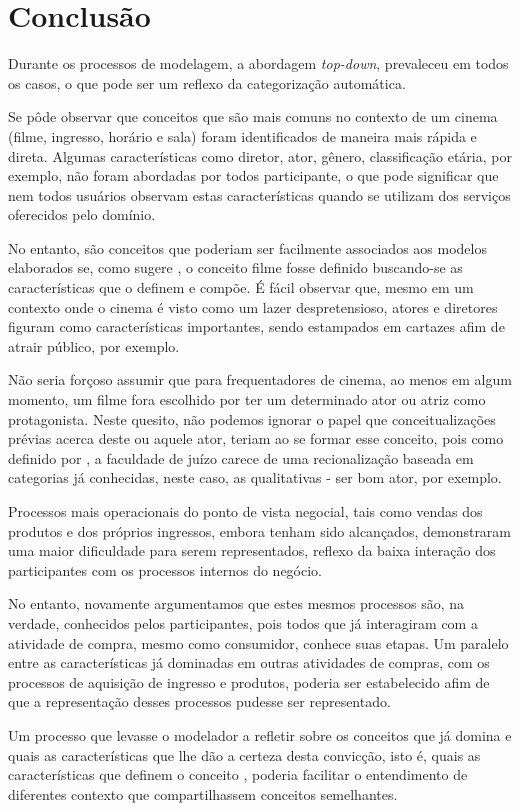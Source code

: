 \section{\hspace*{3pt} Conclusão}
\label{sec:conclusaoModeloConceitual}

Durante os processos de modelagem, a abordagem \textit{top-down}, prevaleceu em todos os casos, o que pode ser um reflexo da categorização automática. 

Se pôde observar que conceitos que são mais comuns no contexto de um cinema (filme, ingresso, horário e sala) foram identificados de maneira mais rápida e direta. Algumas características como diretor, ator, gênero, classificação etária, por exemplo, não foram abordadas por todos participante, o que pode significar que nem todos usuários observam estas características quando se utilizam dos serviços oferecidos pelo domínio.

No entanto, são conceitos que poderiam ser facilmente associados aos modelos elaborados se, como sugere \citet{dahlberg:1978.fundamentos}, o conceito filme fosse definido buscando-se as características que o definem e compõe. É fácil observar que, mesmo em um contexto onde o cinema é visto como um lazer despretensioso, atores e diretores figuram como características importantes, sendo estampados em cartazes afim de atrair público, por exemplo. 

Não seria forçoso assumir que para frequentadores de cinema, ao menos em algum momento, um filme fora escolhido por ter um determinado ator ou atriz como protagonista. Neste quesito, não podemos ignorar o papel que conceitualizações prévias acerca deste ou aquele ator, teriam ao se formar esse conceito, pois como definido por \citet{kant:1983.critica}, a faculdade de juízo carece de uma recionalização baseada em categorias já conhecidas, neste caso, as qualitativas - ser bom ator, por exemplo. 

Processos mais operacionais do ponto de vista negocial, tais como vendas dos produtos e dos próprios ingressos, embora tenham sido alcançados, demonstraram uma maior dificuldade para serem representados, reflexo da baixa interação dos participantes com os processos internos do negócio. 

No entanto, novamente argumentamos que estes mesmos processos são, na verdade, conhecidos pelos participantes, pois todos que já interagiram com a atividade de compra, mesmo como consumidor, conhece suas etapas. Um paralelo entre as características já dominadas em outras atividades de compras, com os processos de aquisição de ingresso e produtos, poderia ser estabelecido afim de que a representação desses processos pudesse ser representado. 

Um processo que levasse o modelador a refletir sobre os conceitos que já domina e quais as características que lhe dão a certeza desta convicção, isto é, quais as características que definem o conceito , poderia facilitar o entendimento de diferentes contexto que compartilhassem conceitos semelhantes.  